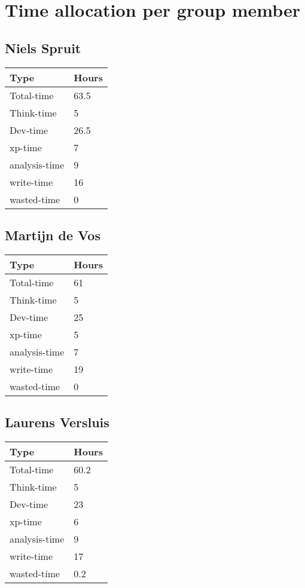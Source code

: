 \section{Time allocation per group member}
\label{apx:time-allocation}

	\subsection{Niels Spruit}
	
	\begin{tabular}{|l|l|}
		\hline 
		Type			& Hours	\\ \hline
		Total-time 		& 63.5	\\ \hline
		Think-time 		& 5		\\ \hline
		Dev-time   		& 26.5	\\ \hline
		xp-time    		& 7		\\ \hline
		analysis-time 	& 9		\\ \hline
		write-time		& 16	\\ \hline
		wasted-time 	& 0	\\ \hline
		
	\end{tabular}
	
	\subsection{Martijn de Vos}
		
	\begin{tabular}{|l|l|}
		\hline 
		Type			& Hours	\\ \hline
		Total-time 		& 61	\\ \hline
		Think-time 		& 5		\\ \hline
		Dev-time   		& 25	\\ \hline
		xp-time    		& 5		\\ \hline
		analysis-time 	& 7		\\ \hline
		write-time		& 19	\\ \hline
		wasted-time 	& 0	\\ \hline
		
	\end{tabular}
	
	\subsection{Laurens Versluis}
			
	\begin{tabular}{|l|l|}
		\hline 
		Type			& Hours	\\ \hline
		Total-time 		& 60.2	\\ \hline
		Think-time 		& 5		\\ \hline
		Dev-time   		& 23	\\ \hline
		xp-time    		& 6		\\ \hline
		analysis-time 	& 9		\\ \hline
		write-time		& 17	\\ \hline
		wasted-time 	& 0.2	\\ \hline
		
	\end{tabular}